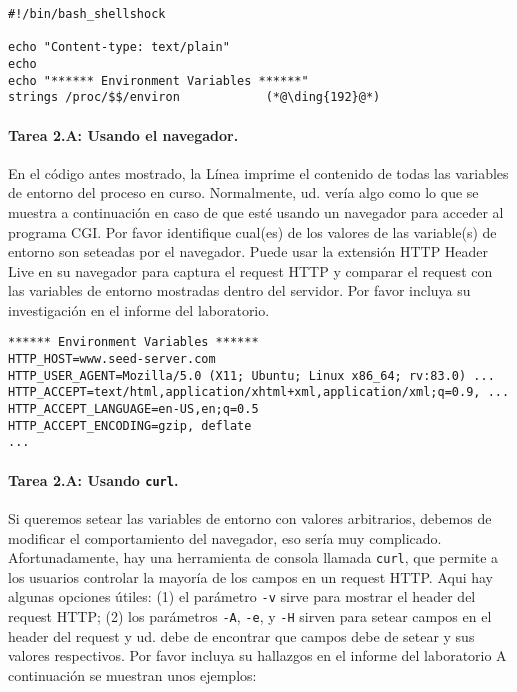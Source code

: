 \begin{lstlisting}[caption=\texttt{getenv.cgi}]
#!/bin/bash_shellshock             

echo "Content-type: text/plain"
echo
echo "****** Environment Variables ******"
strings /proc/$$/environ            (*@\ding{192}@*)
\end{lstlisting}

\paragraph{Tarea 2.A: Usando el navegador.}
En el código antes mostrado, la Línea  imprime el contenido de todas las variables de entorno del proceso en curso. Normalmente, ud. vería algo como lo que se muestra a continuación en caso de que esté usando un navegador para acceder al programa CGI. Por favor identifique cual(es) de los valores de las variable(s) de entorno son seteadas por el navegador. 
Puede usar la extensión HTTP Header Live en su navegador para captura el request HTTP y comparar el request con las variables de entorno mostradas dentro del servidor. Por favor incluya su investigación en el informe del laboratorio.

\begin{lstlisting}
****** Environment Variables ******
HTTP_HOST=www.seed-server.com
HTTP_USER_AGENT=Mozilla/5.0 (X11; Ubuntu; Linux x86_64; rv:83.0) ...
HTTP_ACCEPT=text/html,application/xhtml+xml,application/xml;q=0.9, ...
HTTP_ACCEPT_LANGUAGE=en-US,en;q=0.5
HTTP_ACCEPT_ENCODING=gzip, deflate
...
\end{lstlisting}

 
\paragraph{Tarea 2.A: Usando \texttt{curl}.}
Si queremos setear las variables de entorno con valores arbitrarios, debemos de modificar el comportamiento del navegador, eso sería muy complicado. Afortunadamente, hay una herramienta de consola llamada \texttt{curl}, que permite a los usuarios controlar la mayoría de los campos en un request HTTP. Aqui hay algunas opciones útiles: (1) el parámetro \texttt{-v} sirve para mostrar el header del request HTTP; (2) los parámetros  \texttt{-A}, \texttt{-e}, y 
\texttt{-H} sirven para setear campos en el header del request y ud. debe de encontrar que campos debe de setear y sus valores respectivos.
Por favor incluya su hallazgos en el informe del laboratorio
A continuación se muestran unos ejemplos:
 

